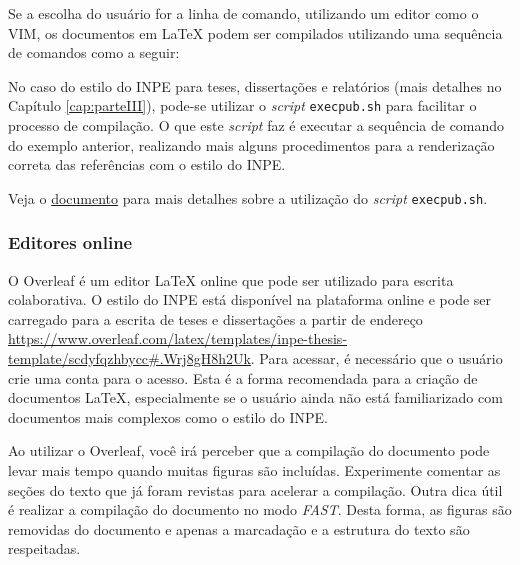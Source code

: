 Se a escolha do usuário for a linha de comando, utilizando um editor como o VIM, os documentos em \LaTeX{} podem ser compilados utilizando uma sequência de comandos como a seguir:


No caso do estilo do INPE para teses, dissertações e relatórios (mais detalhes no Capítulo \ref{cap:parteIII}), pode-se utilizar o \textit{script} {\tt execpub.sh} para facilitar o processo de compilação. O que este \textit{script} faz é executar a sequência de comando do exemplo anterior, realizando mais alguns procedimentos para a renderização correta das referências com o estilo do INPE. 

\begin{marker}
  Veja o \href{http://mtc-m16d.sid.inpe.br/col/sid.inpe.br/mtc-m19@80/2010/03.24.15.12/doc/ambiente_latex_no_linux.pdf}{documento} para mais detalhes sobre a utilização do \textit{script} {\tt execpub.sh}.
\end{marker}

\subsubsection*{Editores online}
\label{sec:ed_online}

O Overleaf é um editor \LaTeX{} online que pode ser utilizado para escrita colaborativa. O estilo do INPE está disponível na plataforma online e pode ser carregado para a escrita de teses e dissertações a partir de endereço \url{https://www.overleaf.com/latex/templates/inpe-thesis-template/scdyfqzhbycc#.Wrj8gH8h2Uk}. Para acessar, é necessário que o usuário crie uma conta para o acesso. Esta é a forma recomendada para a criação de documentos \LaTeX{}, especialmente se o usuário ainda não está familiarizado com documentos mais complexos como o estilo do INPE.

\begin{marker}
  Ao utilizar o Overleaf, você irá perceber que a compilação do documento pode levar mais tempo quando muitas figuras são incluídas. Experimente comentar as seções do texto que já foram revistas para acelerar a compilação. Outra dica útil é realizar a compilação do documento no modo \textit{FAST}. Desta forma, as figuras são removidas do documento e apenas a marcadação e a estrutura do texto são respeitadas.
\end{marker}

